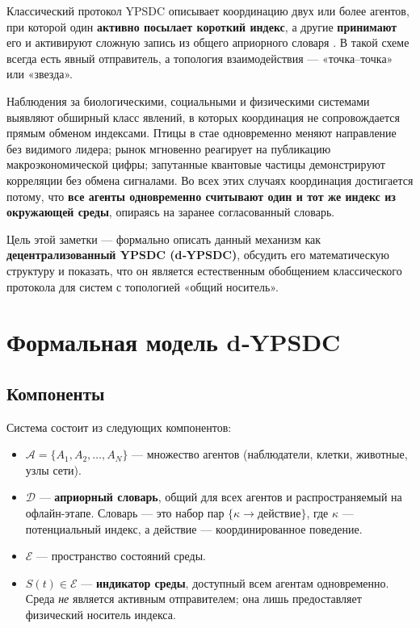 \documentclass[11pt,a4paper]{article}
\begin{document}
	Классический протокол YPSDC описывает координацию двух или более агентов, при которой один \textbf{активно посылает короткий индекс}, а другие \textbf{принимают} его и активируют сложную запись из общего априорного словаря \cite{YUCT}. В такой схеме всегда есть явный отправитель, а топология взаимодействия — «точка–точка» или «звезда».
	
	Наблюдения за биологическими, социальными и физическими системами выявляют обширный класс явлений, в которых координация не сопровождается прямым обменом индексами. Птицы в стае одновременно меняют направление без видимого лидера; рынок мгновенно реагирует на публикацию макроэкономической цифры; запутанные квантовые частицы демонстрируют корреляции без обмена сигналами. Во всех этих случаях координация достигается потому, что \textbf{все агенты одновременно считывают один и тот же индекс из окружающей среды}, опираясь на заранее согласованный словарь.
	
	Цель этой заметки — формально описать данный механизм как \textbf{децентрализованный YPSDC (d‑YPSDC)}, обсудить его математическую структуру и показать, что он является естественным обобщением классического протокола для систем с топологией «общий носитель».
	
	\section{Формальная модель d‑YPSDC}
	
	\subsection{Компоненты}
	
	Система состоит из следующих компонентов:
	
	\begin{itemize}[leftmargin=*]
		\item \(\mathcal{A} = \{A_1, A_2, \dots, A_N\}\) — множество агентов (наблюдатели, клетки, животные, узлы сети).
		\item \(\mathcal{D}\) — \textbf{априорный словарь}, общий для всех агентов и распространяемый на офлайн-этапе. Словарь — это набор пар \(\{ \kappa \to \text{действие} \}\), где \(\kappa\) — потенциальный индекс, а \(\text{действие}\) — координированное поведение.
		\item \(\mathcal{E}\) — пространство состояний среды.
		\item \(S(t) \in \mathcal{E}\) — \textbf{индикатор среды}, доступный всем агентам одновременно. Среда \emph{не} является активным отправителем; она лишь предоставляет физический носитель индекса.
	\end{itemize}
	
\end{document}
